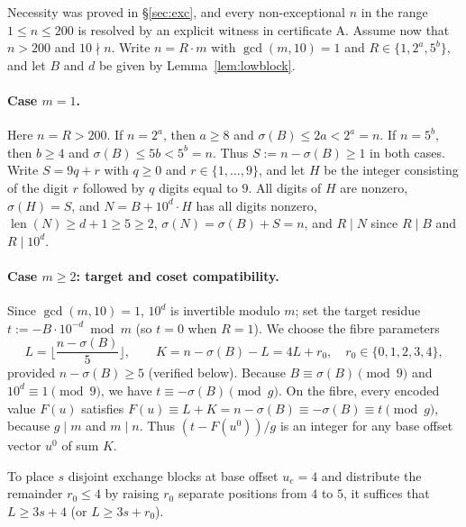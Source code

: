 \documentclass[11pt]{article}
\theoremstyle{remark}
\newcommand{\sig}{\sigma}
\begin{document}
Necessity was proved in \S\ref{sec:exc}, and every non-exceptional $n$ in the
range $1 \le n \le 200$ is resolved by an explicit witness in certificate A.
Assume now that $n > 200$ and $10 \nmid n$. Write $n = R\cdot m$ with
$\gcd(m,10)=1$ and $R \in \{1, 2^a, 5^b\}$, and let $B$ and $d$ be given by
Lemma~\ref{lem:lowblock}.

\paragraph{Case $m = 1$.} Here $n = R > 200$. If $n = 2^a$, then $a \ge 8$ and
$\sig(B) \le 2a < 2^a = n$. If $n = 5^b$, then $b \ge 4$ and
$\sig(B) \le 5b < 5^b = n$. Thus $S := n - \sig(B) \ge 1$ in both cases. Write
$S = 9q + r$ with $q \ge 0$ and $r \in \{1,\dots,9\}$, and let $H$ be the
integer consisting of the digit $r$
followed by $q$ digits equal to $9$. All digits of $H$ are nonzero,
$\sig(H) = S$, and $N = B + 10^d \cdot H$ has all digits nonzero,
$\operatorname{len}(N) \ge d + 1 \ge 5 \ge 2$, $\sig(N) = \sig(B) + S = n$,
and $R \mid N$ since $R \mid B$ and $R \mid 10^d$.

\paragraph{Case $m \ge 2$: target and coset compatibility.} Since $\gcd(m,10)=1$,
$10^d$ is invertible modulo $m$; set the target residue
$t := -B \cdot 10^{-d} \bmod m$ (so $t = 0$ when $R = 1$). We choose the fibre
parameters
\[
 L = \Big\lfloor \frac{n - \sig(B)}{5} \Big\rfloor, \qquad
 K = n - \sig(B) - L = 4L + r_0, \quad r_0 \in \{0,1,2,3,4\},
\]
provided $n - \sig(B) \ge 5$ (verified below). Because $B \equiv \sig(B) \pmod 9$
and $10^d \equiv 1 \pmod 9$, we have $t \equiv -\sig(B) \pmod g$. On the fibre,
every encoded value $F(u)$ satisfies
$F(u) \equiv L + K = n - \sig(B) \equiv -\sig(B) \equiv t \pmod g$, because
$g \mid m$ and $m \mid n$. Thus $(t - F(u^0))/g$ is an integer for any base
offset vector $u^0$ of sum $K$.

To place $s$ disjoint exchange blocks at base offset $u_e = 4$ and distribute
the remainder $r_0 \le 4$ by raising $r_0$ separate positions from $4$ to $5$,
it suffices that $L \ge 3s + 4$ (or $L \ge 3s + r_0$).
\end{document}

